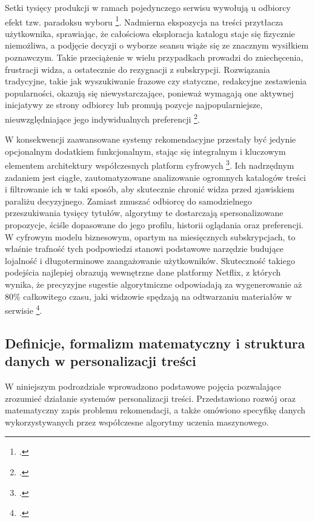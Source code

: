 Setki tysięcy produkcji w ramach pojedynczego serwisu wywołują u odbiorcy efekt tzw. paradoksu wyboru \footcite{schwartzParadoxChoiceWhy2005}. Nadmierna ekspozycja na treści przytłacza użytkownika, sprawiając, że całościowa eksploracja katalogu staje się fizycznie niemożliwa, a podjęcie decyzji o wyborze seansu wiąże się ze znacznym wysiłkiem poznawczym. Takie przeciążenie w wielu przypadkach prowadzi do zniechęcenia, frustracji widza, a ostatecznie do rezygnacji z subskrypcji. Rozwiązania tradycyjne, takie jak wyszukiwanie frazowe czy statyczne, redakcyjne zestawienia popularności, okazują się niewystarczające, ponieważ wymagają one aktywnej inicjatywy ze strony odbiorcy lub promują pozycje najpopularniejsze, nieuwzględniające jego indywidualnych preferencji \footcite{krawczukSystemyRekomendacyjne2024}.

W konsekwencji zaawansowane systemy rekomendacyjne przestały być jedynie opcjonalnym dodatkiem funkcjonalnym, stając się integralnym i kluczowym elementem architektury współczesnych platform cyfrowych \footcite[23--24]{Bernardelli2024}. Ich nadrzędnym zadaniem jest ciągłe, zautomatyzowane analizowanie ogromnych katalogów treści i filtrowanie ich w taki sposób, aby skutecznie chronić widza przed zjawiskiem paraliżu decyzyjnego. Zamiast zmuszać odbiorcę do samodzielnego przeszukiwania tysięcy tytułów, algorytmy te dostarczają spersonalizowane propozycje, ściśle dopasowane do jego profilu, historii oglądania oraz preferencji. W cyfrowym modelu biznesowym, opartym na miesięcznych subskrypcjach, to właśnie trafność tych podpowiedzi stanowi podstawowe narzędzie budujące lojalność i długoterminowe zaangażowanie użytkowników. Skuteczność takiego podejścia najlepiej obrazują wewnętrzne dane platformy Netflix, z których wynika, że precyzyjne sugestie algorytmiczne odpowiadają za wygenerowanie aż 80\% całkowitego czasu, jaki widzowie spędzają na odtwarzaniu materiałów w serwisie \footcite{gomez-uribeNetflixRecommenderSystem2015}.

\subsection{Definicje, formalizm matematyczny i struktura danych w personalizacji treści} %

W niniejszym podrozdziale wprowadzono podstawowe pojęcia pozwalające zrozumieć działanie systemów personalizacji treści. Przedstawiono rozwój oraz matematyczny zapis problemu rekomendacji, a także omówiono specyfikę danych wykorzystywanych przez współczesne algorytmy uczenia maszynowego.

